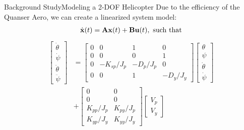 \documentclass{beamer}
\begin{document}
\begin{frame}{Background Study}{Modeling a 2-DOF Helicopter}
Due to the efficiency of the Quanser Aero, we can create a linearized system model:
\begin{align}
    \dot{\bf x}(t) = {\bf A}{\bf x}(t) +{\bf B}{\bf u}(t),~\mathrm{such}~\mathrm{that}
\label{eq:stateModel}
\end{align}  
%
\begin{align*}
\begin{bmatrix}
    \dot\theta\\
    \dot\psi\\
    \ddot{\theta}\\
    \ddot{\psi}
\end{bmatrix}&=
\begin{bmatrix}
    0 & 0 & 1 & 0 \\
    0 & 0 & 0 & 1 \\
    0 & -K_{sp}/J_p & -D_p/J_p & 0 \\
    0 & 0 & 1 & -D_y/J_y 
\end{bmatrix} 
\begin{bmatrix}
    \theta\\
    \psi\\
    \dot{\theta}\\
    \dot{\psi}
\end{bmatrix}
\\&+
\begin{bmatrix}
    0 & 0 \\
    0 & 0 \\
    K_{pp}/J_p & K_{py}/J_p \\
    K_{yp}/J_y & K_{yy}/J_y 
\end{bmatrix}
\begin{bmatrix}
    V_p \\
    V_y 
\end{bmatrix}
\end{align*}
\end{frame}
\end{document}
